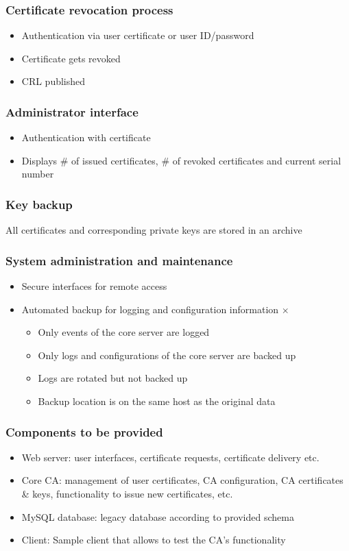 \documentclass{report}
\begin{document}
\subsubsection{Certificate revocation process}
\begin{itemize}
\item Authentication via user certificate or user ID/password \checkmark
\item Certificate gets revoked \checkmark
\item CRL published \checkmark
\end{itemize}
\subsubsection{Administrator interface}
\begin{itemize}
\item Authentication with certificate \checkmark
\item Displays \# of issued certificates, \# of revoked certificates and current serial number \checkmark
\end{itemize}
\subsubsection{Key backup}
All certificates and corresponding private keys are stored in an archive \checkmark
\subsubsection{System administration and maintenance}
\begin{itemize}
\item Secure interfaces for remote access \checkmark
\item Automated backup for logging and configuration information $\times$
	\begin{itemize}
	\item Only events of the core server are logged
	\item Only logs and configurations of the core server are backed up
	\item Logs are rotated but not backed up
	\item Backup location is on the same host as the original data
	\end{itemize}
\end{itemize}
\subsubsection{Components to be provided}
\begin{itemize}
\item Web server: user interfaces, certificate requests, certificate delivery etc. \checkmark
\item Core CA: management of user certificates, CA configuration, CA certificates \& keys, functionality to issue new certificates, etc. \checkmark
\item MySQL database: legacy database according to provided schema \checkmark
\item Client: Sample client that allows to test the CA's functionality \checkmark
\end{itemize}
\end{document}
